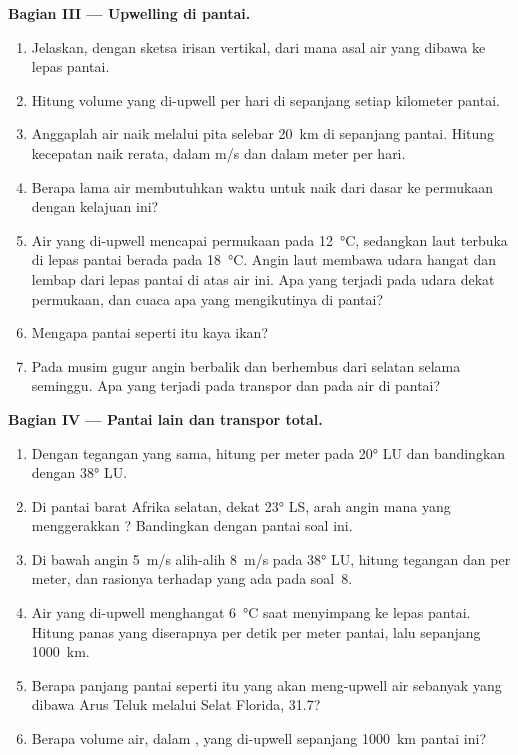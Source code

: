 \begin{problem}
\medskip
\noindent\textbf{Bagian III --- Upwelling di pantai.}
\begin{enumerate}[resume]
  \item Jelaskan, dengan sketsa irisan vertikal, dari mana asal air yang dibawa ke lepas pantai.
  \item Hitung volume yang di-upwell per hari di sepanjang setiap kilometer pantai.
  \item Anggaplah air naik melalui pita selebar \qty{20}{km} di sepanjang pantai. Hitung kecepatan naik rerata, dalam \unit{m/s} dan dalam meter per hari.
  \item Berapa lama air membutuhkan waktu untuk naik dari dasar  ke permukaan dengan kelajuan ini?
  \item Air yang di-upwell mencapai permukaan pada \qty{12}{\celsius}, sedangkan laut terbuka di lepas pantai berada pada \qty{18}{\celsius}. Angin laut membawa udara hangat dan lembap dari lepas pantai di atas air ini. Apa yang terjadi pada udara dekat permukaan, dan cuaca apa yang mengikutinya di pantai?
  \item Mengapa pantai seperti itu kaya ikan?
  \item Pada musim gugur angin berbalik dan berhembus dari selatan selama seminggu. Apa yang terjadi pada transpor dan pada air di pantai?
\end{enumerate}

\medskip
\noindent\textbf{Bagian IV --- Pantai lain dan transpor total.}
\begin{enumerate}[resume]
  \item Dengan tegangan yang sama, hitung  per meter pada \ang{20} LU dan bandingkan dengan \ang{38} LU.
  \item Di pantai barat Afrika selatan, dekat \ang{23} LS, arah angin mana yang menggerakkan ? Bandingkan dengan pantai soal ini.
  \item Di bawah angin \qty{5}{m/s} alih-alih \qty{8}{m/s} pada \ang{38} LU, hitung tegangan dan  per meter, dan rasionya terhadap yang ada pada soal~8.
  \item Air yang di-upwell menghangat \qty{6}{\celsius} saat menyimpang ke lepas pantai. Hitung panas yang diserapnya per detik per meter pantai, lalu sepanjang \qty{1000}{km}.
  \item Berapa panjang pantai seperti itu yang akan meng-upwell air sebanyak yang dibawa Arus Teluk melalui Selat Florida, \qty{31.7}{\sverdrup}?
  \item Berapa volume air, dalam , yang di-upwell sepanjang \qty{1000}{km} pantai ini?
\end{enumerate}
\end{problem}
